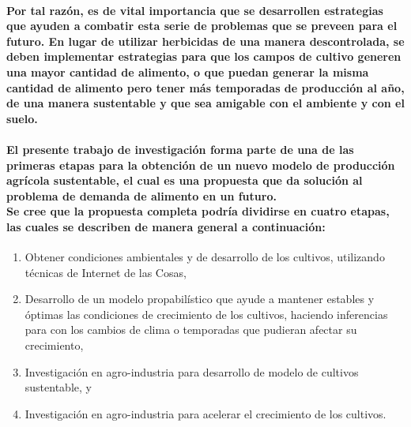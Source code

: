 \documentclass[10pt, twocolumn]{article}
\begin{document}
\paragraph{Por tal razón, es de vital importancia que se desarrollen estrategias que ayuden a combatir esta serie de problemas que se preveen para el futuro. En lugar de utilizar herbicidas de una manera descontrolada, se deben implementar estrategias para que los campos de cultivo generen una mayor cantidad de alimento, o que puedan generar la misma cantidad de alimento pero tener más temporadas de producción al año, de una manera sustentable y que sea amigable con el ambiente y con el suelo.}

\paragraph{El presente trabajo de investigación forma parte de una de las primeras etapas para la obtención de un nuevo modelo de producción agrícola sustentable, el cual es una propuesta que da solución al problema de demanda de alimento en un futuro. \\ Se cree que la propuesta completa podría dividirse en cuatro etapas, las cuales se describen de manera general a continuación:}
\begin{enumerate}
	\item{Obtener condiciones ambientales y de desarrollo de los cultivos, utilizando técnicas de Internet de las Cosas,}
	\item{Desarrollo de un modelo propabilístico que ayude a mantener estables y óptimas las condiciones de crecimiento de los cultivos, haciendo inferencias para con los cambios de clima o temporadas que pudieran afectar su crecimiento,}
	\item{Investigación en agro-industria para desarrollo de modelo de cultivos sustentable, y}
	\item{Investigación en agro-industria para acelerar el crecimiento de los cultivos.}
\end{enumerate}
\end{document}
